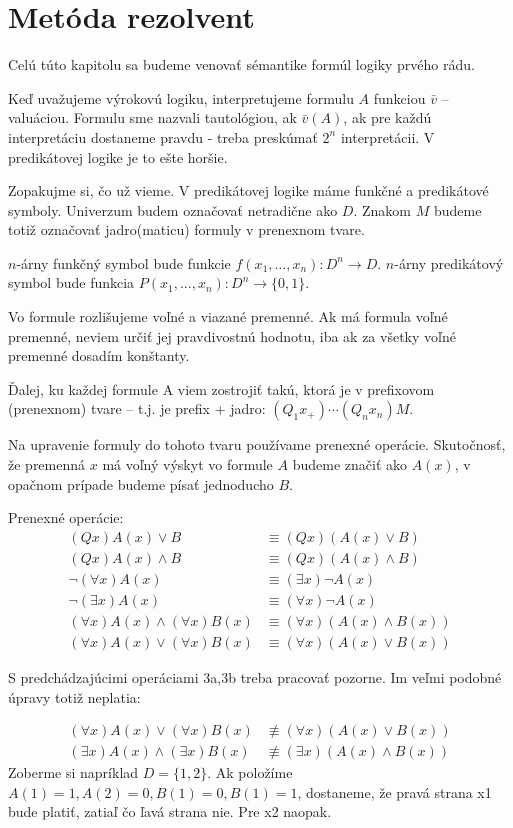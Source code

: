 \section{Metóda rezolvent}

Celú túto kapitolu sa budeme venovať sémantike formúl logiky prvého
rádu.

Keď uvažujeme výrokovú logiku, interpretujeme formulu $A$ funkciou
$\bar{v}$ -- valuáciou.
Formulu sme nazvali tautológiou, ak $\bar{v}(A)$, ak pre každú
interpretáciu dostaneme pravdu - treba preskúmať $2^n$ interpretácii.
V predikátovej logike je to ešte horšie.

Zopakujme si, čo už vieme. V predikátovej logike máme funkčné a
predikátové symboly. Univerzum budem označovať netradične ako $D$.
Znakom $M$ budeme totiž označovať jadro(maticu) formuly v prenexnom
tvare.

$n$-árny funkčný symbol bude funkcie $f(x_1,\dots,x_n): D^n \rightarrow D$.
$n$-árny predikátový symbol bude funkcia
$P(x_1,\dots,x_n): D^n \rightarrow \{0,1\}$.

Vo formule rozlišujeme voľné a viazané premenné.
Ak má formula voľné premenné, neviem určiť jej pravdivostnú hodnotu,
iba ak za všetky voľné premenné dosadím konštanty.

Ďalej, ku každej formule A viem zostrojiť takú,
ktorá je v prefixovom (prenexnom) tvare -- t.j. je 
prefix + jadro: $(Q_1 x_+)\cdots(Q_n x_n)M$.

Na upravenie formuly do tohoto tvaru používame prenexné operácie.
Skutočnosť, že premenná $x$ má voľný výskyt vo formule $A$ budeme
značiť ako $A(x)$, v opačnom prípade budeme písať jednoducho $B$.

Prenexné operácie:
\begin{align*}
    (Qx)A(x) \lor B &\equiv (Qx)(A(x) \lor B) \tag{1a}\\
    (Qx)A(x) \land B &\equiv (Qx)(A(x) \land B) \tag{1b}\\
    \neg (\forall x) A(x) &\equiv (\exists x) \neg A(x) \tag{2a}\\
    \neg (\exists x) A(x) &\equiv (\forall x) \neg A(x) \tag{2b}\\
    (\forall x) A(x) \land (\forall x) B(x) &\equiv 
        (\forall x) (A(x) \land B(x)) \tag{3a}\\
    (\forall x) A(x) \lor (\forall x) B(x) &\equiv
        (\forall x) (A(x) \lor B(x)) \tag{3b}
\end{align*}
\begin{poznamka}
    S predchádzajúcimi operáciami 3a,3b treba pracovať pozorne. Im veľmi
    podobné úpravy totiž neplatia:

    \begin{align*}
      (\forall x) A(x) \lor (\forall x) B(x)  & \not \equiv
        (\forall x) (A(x) \lor B(x)) \tag{x1}\\
      (\exists x) A(x) \land (\exists x) B(x) & \not \equiv
        (\exists x) (A(x) \land B(x)) \tag{x2}
    \end{align*}
    Zoberme si napríklad $D=\{1,2\}$. Ak položíme
    $A(1)=1, A(2)=0, B(1)=0, B(1)=1$, dostaneme, že pravá strana x1 bude
    platiť, zatiaľ čo ľavá strana nie. Pre x2 naopak.
\end{poznamka}

